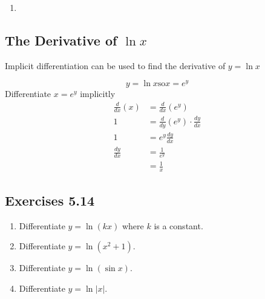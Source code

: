 \begin{enumerate}
\item   
\columnsep =30pt
 \end{enumerate}


\subsection{The Derivative of $\ln  x$}
Implicit differentiation can be used to find the derivative of $y =\ln  x$ 

\begin{equation*}y =\ln  x\text{so}x =e^{y}
\end{equation*}Differentiate $x =e^{y}$ implicitly
\begin{align*}\frac{d}{d x} \left (x\right ) &  = \frac{d}{d x} \left (e^{y}\right ) \\
1 &  = \frac{d}{d y} (e^{y}) \cdot \frac{d y}{d x} \\
1 &  = e^{y} \frac{d y}{d x} \\
\frac{d y}{d x} &  = \frac{1}{e^{y}} \\
 &  = \frac{1}{x}\end{align*}

\subsection{Exercises 5.14}
\begin{enumerate}
\item Differentiate $y =\ln  (k x)$ where $k$ is a constant. 

\item Differentiate $y =\ln  (x^{2} +1)$. 

\item Differentiate $y =\ln  (\sin  x)$. 

\item Differentiate $y =\ln  \left \vert x\right \vert \text{.}$ \end{enumerate}


